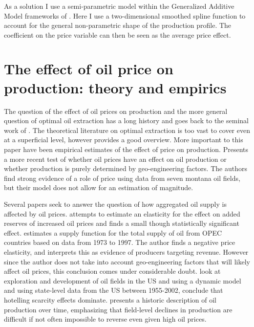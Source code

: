 \documentclass[12pt]{scrartcl} %
\begin{document}
As a solution I use a semi-parametric model within the Generalized Additive Model frameworks of \cite{hastie_generalized_1990}.  Here I use a two-dimensional smoothed spline function to account for the general non-parametric shape of the production profile.  The coefficient on the price variable can then be seen as the average price effect.  

\section{The effect of oil price on production: theory and empirics}
The question of the effect of oil prices on production and the more general question of optimal oil extraction has a long history and goes back to the seminal work of \citet{hotelling_economics_1931}.  The theoretical literature on optimal extraction is too vast to cover even at a superficial level, however \citet{krautkraemer_nonrenewable_1998} provides a good overview.  More important to this paper have been empirical estimates of the effect of price on production.  \citet{black_is_1998} Presents a more recent test of whether oil prices have an effect on oil production or whether production is purely determined by geo-engineering factors.  The authors find strong evidence of a role of price using data from seven montana oil fields, but their model does not allow for an estimation of magnitude.  

Several papers seek to answer the question of how aggregated oil supply is affected by oil prices.  \citet{farzin_impact_2001} attempts to estimate an elasticity for the effect on added reserves of increased oil prices and finds a small though statistically significant effect.  \citet{ramcharran_oil_2002} estimates a supply function for the total supply of oil from OPEC countries based on data from 1973 to 1997.  The author finds a negative price elasticity, and interprets this as evidence of producers targeting revenue.  However since the author does not take into account geo-engineering factors that will likely affect oil prices, this conclusion comes under considerable doubt.  \citet{boyce_exploration_2011} look at exploration and development of oil fields in the US and using a dynamic model and using state-level data from the US between 1955-2002, conclude that hotelling scarcity effects dominate.  \citet{hamilton_oil_2012} presents a historic description of oil production over time, emphasizing that field-level declines in production are difficult if not often impossible to reverse even given high oil prices.  
\end{document}
